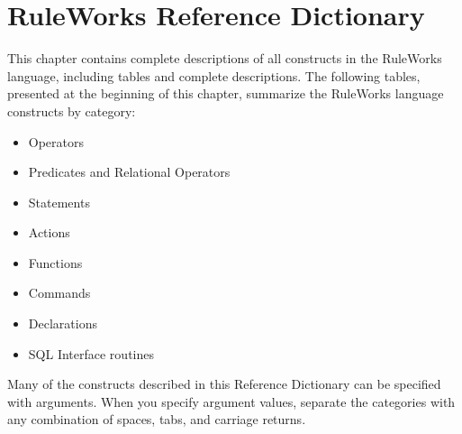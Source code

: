 \chapter{RuleWorks Reference Dictionary}

\makeatletter
\newenvironment{operands}
               {\vspace{1ex}\noindent\textbf{Operands}\nopagebreak
                 \list{}{\labelwidth\z@ \itemindent-\leftmargin
                   \topsep=\z@                   
                   \let\makelabel\operandlabel\let\labelsep=\textwidth}}
               {\endlist}
\newenvironment{arguments}
               {\vspace{1ex}\noindent\textbf{Arguments}\@beginparpenalty=10000
                 \list{}{\labelwidth\z@ \itemindent-\leftmargin
                   \topsep=\z@                   
                   \let\makelabel\operandlabel\let\labelsep=\textwidth}}
               {\endlist}
\newenvironment{argument}
               {\vspace{1ex}\noindent\textbf{Argument}\@beginparpenalty=10000
                 \list{}{\labelwidth\z@ \itemindent-\leftmargin
                   \topsep=\z@                   
                   \let\makelabel\operandlabel\let\labelsep=\textwidth}}
               {\endlist}
\newcommand*\operandlabel[1]{\hspace\labelsep
  \parbox[t]\textwidth{\normalfont\it{#1}\vspace{1.5ex}}}
\makeatother

This chapter contains complete descriptions of all constructs in the
RuleWorks language, including tables and complete descriptions. The
following tables, presented at the beginning of this chapter,
summarize the RuleWorks language constructs by category:

\begin{itemize}
\item Operators
\item Predicates and Relational Operators
\item Statements
\item Actions
\item Functions
\item Commands
\item Declarations
\item SQL Interface routines
\end{itemize}

Many of the constructs described in this Reference Dictionary can be
specified with arguments. When you specify argument values, separate
the categories with any combination of spaces, tabs, and carriage
returns.

